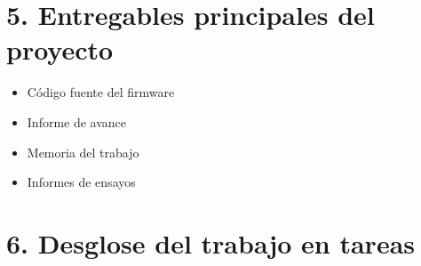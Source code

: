 \documentclass[11pt]{charter}
\begin{document}
\section{5. Entregables principales del proyecto}
\label{sec:entregables}

\begin{itemize}
\item Código fuente del firmware
\item Informe de avance
\item Memoria del trabajo
\item Informes de ensayos
\end{itemize}

\section{6. Desglose del trabajo en tareas}
\label{sec:wbs}
\end{document}
